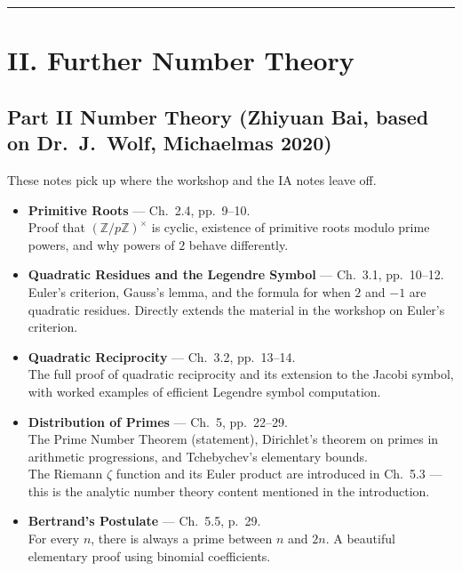 \documentclass[11pt]{article}
\begin{document}
\vspace{1em}
\hrule
\vspace{1em}

\section*{II. Further Number Theory}
\subsection*{Part II Number Theory (Zhiyuan Bai, based on Dr.\ J.\ Wolf, Michaelmas 2020)}

These notes pick up where the workshop and the IA notes leave off.
\vspace{0.5em}
\begin{itemize}
    \item \textbf{Primitive Roots} --- Ch.~2.4, pp.~9--10. \\
    Proof that $(\mathbb{Z}/p\mathbb{Z})^\times$ is cyclic, existence of primitive roots modulo prime powers, and why powers of $2$ behave differently.

    \item \textbf{Quadratic Residues and the Legendre Symbol} --- Ch.~3.1, pp.~10--12. \\
    Euler's criterion, Gauss's lemma, and the formula for when $2$ and $-1$ are quadratic residues. Directly extends the material in the workshop on Euler's criterion.

    \item \textbf{Quadratic Reciprocity} --- Ch.~3.2, pp.~13--14. \\
    The full proof of quadratic reciprocity and its extension to the Jacobi symbol, with worked examples of efficient Legendre symbol computation.

    \item \textbf{Distribution of Primes} --- Ch.~5, pp.~22--29. \\
    The Prime Number Theorem (statement), Dirichlet's theorem on primes in arithmetic progressions, and Tchebychev's elementary bounds. \\
    The Riemann $\zeta$ function and its Euler product are introduced in Ch.~5.3 --- this is the analytic number theory content mentioned in the introduction.

    \item \textbf{Bertrand's Postulate} --- Ch.~5.5, p.~29. \\
    For every $n$, there is always a prime between $n$ and $2n$. A beautiful elementary proof using binomial coefficients.


\end{itemize}
\end{document}
